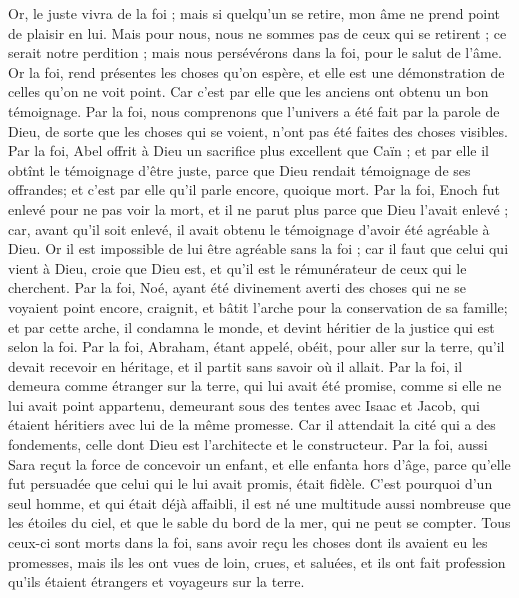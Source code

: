 \begin{multicols}{2}
Or, le juste vivra de la foi ; mais si quelqu'un se retire, mon âme ne prend point de plaisir en lui.
Mais pour nous, nous ne sommes pas de ceux qui se retirent ; ce serait notre perdition ; mais nous persévérons dans la foi, pour le salut de l'âme.
\VerseOne{}Or la foi, rend présentes les choses qu'on espère, et elle est une démonstration de celles qu'on ne voit point.
Car c'est par elle que les anciens ont obtenu un bon  témoignage.
Par la foi, nous comprenons que l'univers a été fait par la parole de Dieu, de sorte que les choses qui se voient, n'ont pas été faites des choses visibles.
Par la foi, Abel offrit à Dieu un sacrifice plus excellent que Caïn ; et par elle il obtînt le témoignage d'être juste, parce que Dieu rendait témoignage de ses offrandes; et c'est par elle qu'il parle encore, quoique mort.
Par la foi, Enoch fut enlevé pour ne pas voir la mort, et il ne parut plus parce que Dieu l'avait enlevé ; car, avant qu'il soit enlevé, il avait obtenu le témoignage d'avoir été agréable à Dieu.
Or il est impossible de lui être agréable sans la foi ; car il faut que celui qui vient à Dieu, croie que Dieu est, et qu'il est le rémunérateur de ceux qui le cherchent.
Par la foi, Noé, ayant été divinement averti des choses qui ne se voyaient point encore, craignit, et bâtit l'arche pour la conservation de sa famille; et par cette arche, il condamna le monde, et devint héritier de la justice qui est selon la foi.
Par la foi, Abraham, étant appelé, obéit, pour aller sur la terre, qu'il devait recevoir en héritage, et il partit sans savoir où il allait.
Par la foi, il demeura comme étranger sur la terre, qui lui avait été promise, comme si elle ne lui avait point appartenu, demeurant sous des tentes avec Isaac et Jacob, qui étaient héritiers avec lui de la même promesse.
Car il attendait la cité qui a des fondements, celle dont Dieu est l'architecte et le constructeur.
Par la foi, aussi Sara reçut la force de concevoir un enfant, et elle enfanta hors d'âge, parce qu'elle fut persuadée que celui qui le lui avait promis, était fidèle.
C'est pourquoi d'un seul homme, et qui était déjà affaibli, il est né une multitude aussi nombreuse que les étoiles du ciel, et que le sable du bord de la mer, qui ne peut se compter.
Tous ceux-ci sont morts dans la foi, sans avoir reçu les choses dont ils avaient eu les promesses, mais ils les ont vues de loin, crues, et saluées, et ils ont fait profession qu'ils étaient étrangers et voyageurs sur la terre.

\end{multicols}
